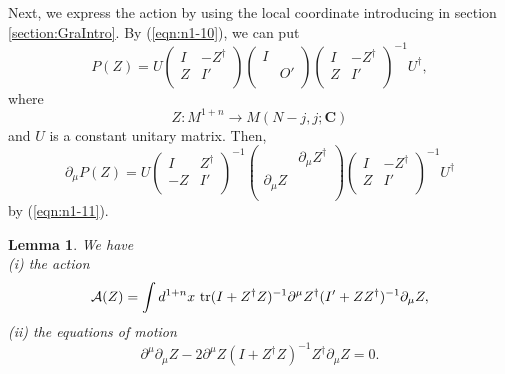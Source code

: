 \documentclass[makeidx,12pt,openany]{report}
\newtheorem{lem}[df]{Lemma}
\begin{document}
Next, we express the action by using the local coordinate introducing in 
section \ref{section:GraIntro}. By (\ref{eqn:n1-10}), we can put 
\begin{equation}
 P(Z)=U
         \left(
           \begin{array}{cc}
               I & -Z^{\dag}  \\
               Z & I' \\
            \end{array}
         \right)  
         \left(
           \begin{array}{cc}
               I &     \\
                 &  O' \\
            \end{array}
         \right) 
         \left(
           \begin{array}{cc}
               I & -Z^{\dag}  \\
               Z & I' \\
            \end{array}
         \right)^{-1}  U^{\dag}, 
 \label{eqn:n2-4}
\end{equation}
where
$$
Z:M^{1+n} \longrightarrow M(N-j,j;{\mathbf{C}})
$$
and $U$ is a constant unitary matrix. 
Then, 
\begin{equation}
 \partial_{\mu}P(Z)=U
         \left(
           \begin{array}{cc}
               I & Z^{\dag}  \\
              -Z & I' \\
            \end{array}
         \right)^{-1}  
         \left(
           \begin{array}{cc}
                              & \partial_{\mu}Z^{\dag}  \\
              \partial_{\mu}Z &                         \\
            \end{array}
         \right) 
         \left(
           \begin{array}{cc}
               I & -Z^{\dag}  \\
               Z & I' \\
            \end{array}
         \right)^{-1} U^{\dag}
 \label{eqn:n2-5}
\end{equation}
by (\ref{eqn:n1-11}). 
\begin{lem}
We have \\
(i) the action 
\begin{equation}
 \mbox{$\cal{A}$}(Z)
  =\int d^{1+n} x \ 
    \mbox{tr}(I+Z^{\dag}Z)^{-1}\partial^{\mu}Z^{\dag}
             (I'+Z Z^{\dag})^{-1}\partial_{\mu}Z,
   \label{eqn:loc-coord}
\end{equation}
(ii) the equations of motion
\begin{equation}
 \partial^{\mu}\partial_{\mu}Z
 -2\partial^{\mu}Z(I+Z^{\dag}Z)^{-1}Z^{\dag}\partial_{\mu}Z=0.
 \label{eqn:eqGra}
\end{equation}
\end{lem}
\end{document}
